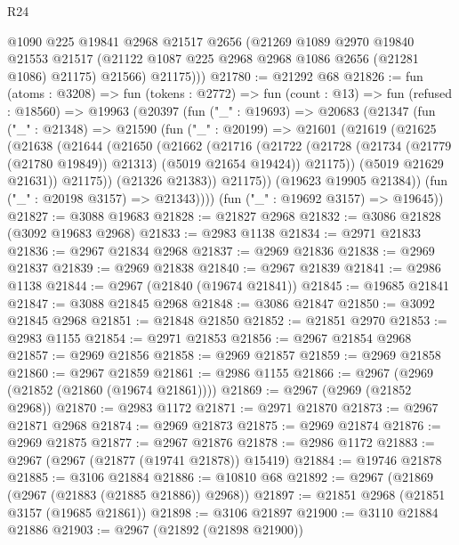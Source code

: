 \begin{lexlean}{R24}
\begin{coremodule}
          @1090
          @225
          @19841
          @2968
          @21517
          @2656
          (@21269
            @1089
            @2970
            @19840
            @21553
            @21517
            (@21122 @1087 @225 @2968 @2968 @1086 @2656 (@21281 @1086) @21175)
            @21566)
          @21175)))
@21780 := @21292 @68
@21826 := fun (atoms : @3208) =>
  fun (tokens : @2772) =>
  fun (count : @13) =>
  fun (refused : @18560) =>
  @19963
    (@20397
      (fun ("_" : @19693) =>
      @20683
        (@21347
          (fun ("_" : @21348) =>
          @21590
            (fun ("_" : @20199) =>
            @21601
              (@21619
                (@21625
                  (@21638
                    (@21644
                      (@21650
                        (@21662
                          (@21716
                            (@21722
                              (@21728
                                (@21734 (@21779 (@21780 @19849)) @21313)
                                (@5019 @21654 @19424))
                              @21175))
                          (@5019 @21629 @21631))
                        @21175))
                    (@21326 @21383))
                  @21175))
              (@19623 @19905 @21384))
            (fun ("_" : @20198 @3157) => @21343))))
      (fun ("_" : @19692 @3157) => @19645))
@21827 := @3088 @19683
@21828 := @21827 @2968
@21832 := @3086 @21828 (@3092 @19683 @2968)
@21833 := @2983 @1138
@21834 := @2971 @21833
@21836 := @2967 @21834 @2968
@21837 := @2969 @21836
@21838 := @2969 @21837
@21839 := @2969 @21838
@21840 := @2967 @21839
@21841 := @2986 @1138
@21844 := @2967 (@21840 (@19674 @21841))
@21845 := @19685 @21841
@21847 := @3088 @21845 @2968
@21848 := @3086 @21847
@21850 := @3092 @21845 @2968
@21851 := @21848 @21850
@21852 := @21851 @2970
@21853 := @2983 @1155
@21854 := @2971 @21853
@21856 := @2967 @21854 @2968
@21857 := @2969 @21856
@21858 := @2969 @21857
@21859 := @2969 @21858
@21860 := @2967 @21859
@21861 := @2986 @1155
@21866 := @2967 (@2969 (@21852 (@21860 (@19674 @21861))))
@21869 := @2967 (@2969 (@21852 @2968))
@21870 := @2983 @1172
@21871 := @2971 @21870
@21873 := @2967 @21871 @2968
@21874 := @2969 @21873
@21875 := @2969 @21874
@21876 := @2969 @21875
@21877 := @2967 @21876
@21878 := @2986 @1172
@21883 := @2967 (@2967 (@21877 (@19741 @21878)) @15419)
@21884 := @19746 @21878
@21885 := @3106 @21884
@21886 := @10810 @68
@21892 := @2967 (@21869 (@2967 (@21883 (@21885 @21886)) @2968))
@21897 := @21851 @2968 (@21851 @3157 (@19685 @21861))
@21898 := @3106 @21897
@21900 := @3110 @21884 @21886
@21903 := @2967 (@21892 (@21898 @21900))

\end{coremodule}
\end{lexlean}
